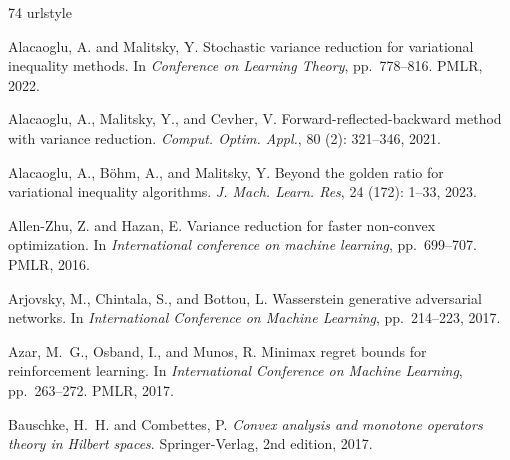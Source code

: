 \documentclass{article}
\theoremstyle{plain}
\theoremstyle{definition}
\theoremstyle{remark}
\begin{document}
%
%

\begin{thebibliography}{74}
\providecommand{\natexlab}[1]{#1}
\providecommand{\url}[1]{\texttt{#1}}
\expandafter\ifx\csname urlstyle\endcsname\relax
  \providecommand{\doi}[1]{doi: #1}\else
  \providecommand{\doi}{doi: \begingroup \urlstyle{rm}\Url}\fi

Alacaoglu, A. and Malitsky, Y.
\newblock Stochastic variance reduction for variational inequality methods.
\newblock In \emph{Conference on Learning Theory}, pp.\  778--816. PMLR, 2022.

Alacaoglu, A., Malitsky, Y., and Cevher, V.
\newblock Forward-reflected-backward method with variance reduction.
\newblock \emph{Comput. Optim. Appl.}, 80 (2): 321--346,
  2021.

Alacaoglu, A., B{\"o}hm, A., and Malitsky, Y.
\newblock Beyond the golden ratio for variational inequality algorithms.
\newblock \emph{J. Mach. Learn. Res}, 24 (172): 1--33, 2023.

Allen-Zhu, Z. and Hazan, E.
\newblock Variance reduction for faster non-convex optimization.
\newblock In \emph{International conference on machine learning}, pp.\
  699--707. PMLR, 2016.

Arjovsky, M., Chintala, S., and Bottou, L.
\newblock Wasserstein generative adversarial networks.
\newblock In \emph{International Conference on Machine Learning}, pp.\
  214--223, 2017.

Azar, M.~G., Osband, I., and Munos, R.
\newblock Minimax regret bounds for reinforcement learning.
\newblock In \emph{International Conference on Machine Learning}, pp.\
  263--272. PMLR, 2017.

Bauschke, H.~H. and Combettes, P.
\newblock \emph{Convex analysis and monotone operators theory in {H}ilbert
  spaces}.
\newblock Springer-Verlag, 2nd edition, 2017.


\end{thebibliography}
\end{document}
